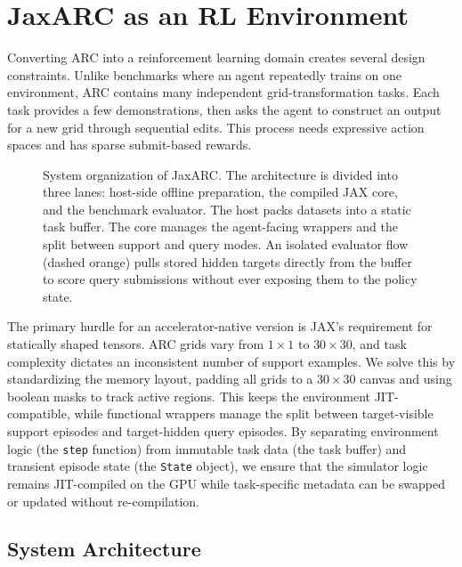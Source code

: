 \section{JaxARC as an RL Environment}\label{sec:jaxarc_environment}

Converting ARC into a reinforcement learning domain creates several design constraints. Unlike benchmarks where an agent repeatedly trains on one environment, ARC contains many independent grid-transformation tasks. Each task provides a few demonstrations, then asks the agent to construct an output for a new grid through sequential edits. This process needs expressive action spaces and has sparse submit-based rewards.

\begin{figure}[htbp]
\centering
\resizebox{0.97\textwidth}{!}{}
\caption{System organization of JaxARC. The architecture is divided into three lanes: host-side offline preparation, the compiled JAX core, and the benchmark evaluator. The host packs datasets into a static task buffer. The core manages the agent-facing wrappers and the split between support and query modes. An isolated evaluator flow (dashed orange) pulls stored hidden targets directly from the buffer to score query submissions without ever exposing them to the policy state.}
\label{fig:jaxarc_system_organization}
\end{figure}

The primary hurdle for an accelerator-native version is JAX's requirement for statically shaped tensors. ARC grids vary from $1\times1$ to $30\times30$, and task complexity dictates an inconsistent number of support examples. We solve this by standardizing the memory layout, padding all grids to a $30\times30$ canvas and using boolean masks to track active regions. This keeps the environment JIT-compatible, while functional wrappers manage the split between target-visible support episodes and target-hidden query episodes. By separating environment logic (the \texttt{step} function) from immutable task data (the task buffer) and transient episode state (the \texttt{State} object), we ensure that the simulator logic remains JIT-compiled on the GPU while task-specific metadata can be swapped or updated without re-compilation.

\subsection{System Architecture}

